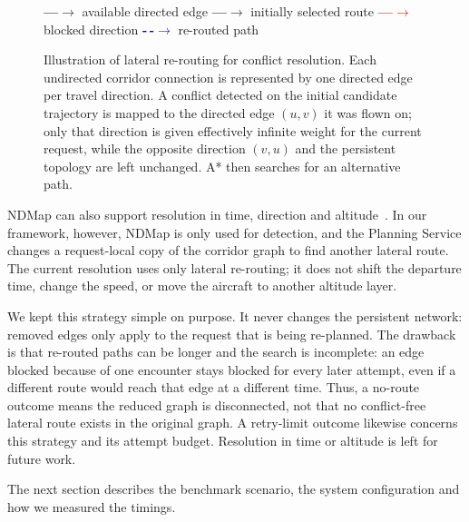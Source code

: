 \begin{figure}[!htbp]
{\begin{minipage}[t]{0.46\textwidth}
    \end{minipage}}

    \vspace{2mm}
    {\footnotesize
    \textcolor{gray!65}{\textbf{---\!\!\(\rightarrow\)}} available directed edge \quad
    \textcolor{green!55!black}{\textbf{---\!\!\(\rightarrow\)}} initially selected route \quad
    \textcolor{red}{\textbf{---\!\!\(\rightarrow\)}} blocked direction \quad
    \textcolor{blue}{\textbf{-\,-\!\(\rightarrow\)}} re-routed path}

    \caption{Illustration of lateral re-routing for conflict resolution. Each undirected corridor connection is represented by one directed edge per travel direction. A conflict detected on the initial candidate trajectory is mapped to the directed edge \((u,v)\) it was flown on; only that direction is given effectively infinite weight for the current request, while the opposite direction \((v,u)\) and the persistent topology are left unchanged. A* then searches for an alternative path.}
    \label{fig:conflict_resolution_re-routing}
\end{figure}

NDMap can also support resolution in time, direction and altitude~\cite{NDMap}. In our framework, however, NDMap is only used for detection, and the Planning Service changes a request-local copy of the corridor graph to find another lateral route. The current resolution uses only lateral re-routing; it does not shift the departure time, change the speed, or move the aircraft to another altitude layer.

We kept this strategy simple on purpose. It never changes the persistent network: removed edges only apply to the request that is being re-planned. The drawback is that re-routed paths can be longer and the search is incomplete: an edge blocked because of one encounter stays blocked for every later attempt, even if a different route would reach that edge at a different time. Thus, a no-route outcome means the reduced graph is disconnected, not that no conflict-free lateral route exists in the original graph. A retry-limit outcome likewise concerns this strategy and its attempt budget. Resolution in time or altitude is left for future work.

The next section describes the benchmark scenario, the system configuration and how we measured the timings.
